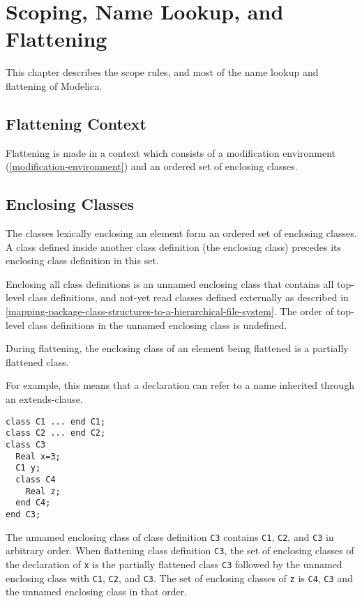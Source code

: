 \chapter{Scoping, Name Lookup, and Flattening}

This chapter describes the scope rules, and most of the name lookup and
flattening of Modelica.

\section{Flattening Context}

Flattening is made in a context which consists of a modification
environment (\autoref{modification-environment}) and an ordered set of enclosing classes.

\section{Enclosing Classes}

The classes lexically enclosing an element form an ordered set of
enclosing classes. A class defined inside another class definition (the
enclosing class) precedes its enclosing class definition in this set.

Enclosing all class definitions is an unnamed enclosing class that
contains all top-level class definitions, and not-yet read classes
defined externally as described in \autoref{mapping-package-class-structures-to-a-hierarchical-file-system}. The order of
top-level class definitions in the unnamed enclosing class is undefined.

During flattening, the enclosing class of an element being flattened is
a partially flattened class.

\begin{nonnormative}
For example, this means that a declaration can refer to a name inherited through an extends-clause.
\end{nonnormative}

\begin{example}
\begin{lstlisting}[language=modelica]
class C1 ... end C1;
class C2 ... end C2;
class C3
  Real x=3;
  C1 y;
  class C4
    Real z;
  end C4;
end C3;
\end{lstlisting}

The unnamed enclosing class of class definition \lstinline!C3! contains \lstinline!C1!,
\lstinline!C2!, and \lstinline!C3! in arbitrary order. When flattening class definition \lstinline!C3!, the
set of enclosing classes of the declaration of \lstinline!x! is the partially
flattened class \lstinline!C3! followed by the unnamed enclosing class with \lstinline!C1!, \lstinline!C2!,
and \lstinline!C3!. The set of enclosing classes of \lstinline!z! is \lstinline!C4!, \lstinline!C3! and the unnamed
enclosing class in that order.
\end{example}

